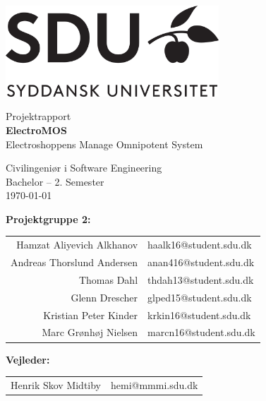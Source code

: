\begin{titlepage}
\nolinenumbers
\centering

\includegraphics[width=8cm]{start/figurer/sdu_logo.png}

\hfill \newline \hfill \newline \hfill \newline \hfill \newline
\large{Projektrapport} \\ \hfill \newline
\textbf{{\Huge ElectroMOS}} \\
Electroshoppens Manage Omnipotent System


\hfill \newline \hfill \newline \hfill \newline \hfill \newline
\hfill \newline \hfill \newline
Civilingeniør i Software Engineering \\
Bachelor -- 2. Semester \\
\hfill \newline \hfill \newline
\today

\hfill \newline \hfill \newline \hfill \newline \hfill \newline
\textbf{Projektgruppe 2:} \\
\hfill \newline
\begin{tabular}{rl}
	Hamzat Aliyevich Alkhanov & haalk16@student.sdu.dk \\
    Andreas Thorslund Andersen & anan416@student.sdu.dk \\
    Thomas Dahl & thdah13@student.sdu.dk \\
	Glenn Drescher	& glped15@student.sdu.dk  \\
    Kristian Peter Kinder & krkin16@student.sdu.dk \\
    Marc Grønhøj Nielsen & marcn16@student.sdu.dk 
\end{tabular}

\hfill \newline \hfill \newline
\textbf{Vejleder:} \\
\hfill \newline
\begin{tabular}{rl}
	Henrik Skov Midtiby	 & hemi@mmmi.sdu.dk \\
\end{tabular}


\linenumbers
\end{titlepage}

